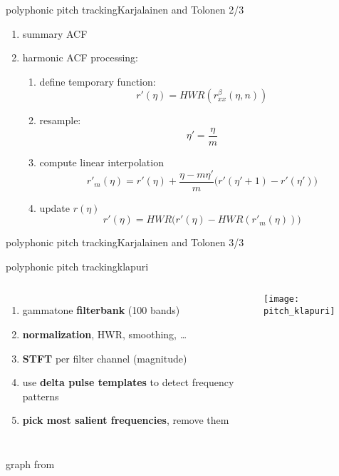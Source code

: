 	\begin{frame}{polyphonic pitch tracking}{Karjalainen and Tolonen 2/3}
		\begin{enumerate}
			\item	summary ACF
			\pause
			\item	harmonic ACF processing:
				\begin{enumerate}
					\item	define temporary function:
						\begin{equation*}
							r'(\eta) = HWR(r_{xx}^\beta (\eta,n)) 
						\end{equation*}
					\pause
					\item	resample:
						\begin{equation*}
							\eta' = \frac{\eta}{m}
						\end{equation*}
					\pause
					\item	compute linear interpolation
						\begin{equation*}
							r'_m(\eta) = r'(\eta) + \frac{\eta-m\eta'}{m}\big(r'(\eta'+1) - r'(\eta')\big)
						\end{equation*}
					\pause
					\item	update $r(\eta)$
						\begin{equation*}
							r'(\eta) = HWR\big(r'(\eta) - HWR(r'_m(\eta))\big) 
						\end{equation*}
				\end{enumerate}
		\end{enumerate}
	\end{frame}
	
	\begin{frame}{polyphonic pitch tracking}{Karjalainen and Tolonen 3/3}
	\end{frame}
	
	\begin{frame}{polyphonic pitch tracking}{klapuri}
        \begin{columns}[T]
                \begin{enumerate}
                    \item	gammatone \textbf{filterbank} (100 bands)
                    \item<2->	\textbf{normalization}, HWR, smoothing, \ldots
                    \item<3->	\textbf{STFT} per filter channel (magnitude)
                    \item<4->	use \textbf{delta pulse templates} to detect frequency patterns
                    \item<5->	\textbf{pick most salient frequencies}, remove them
                \end{enumerate}
                \texttt{[image: pitch\_klapuri]}
        \end{columns}
    \bigskip
    
    \begin{flushright}
        graph from 
    \end{flushright}
	\end{frame}
    
